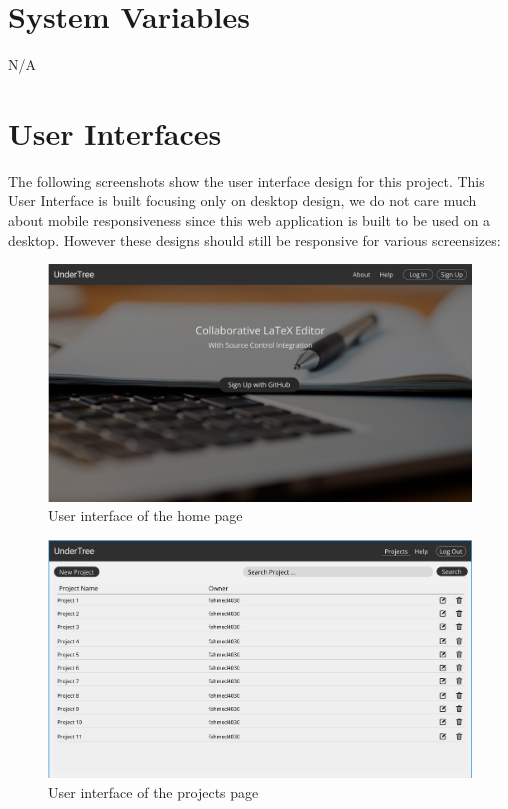 \documentclass[12pt, titlepage]{article}
\begin{document}
	\section{System Variables}
	
	N/A
	
	\section{User Interfaces}
	
	The following screenshots show the user interface design for this project. This User Interface is built focusing only on desktop design, we do not care much about mobile responsiveness since this web application is built to be used on a desktop. However these designs should still be responsive for various screensizes:
	
	\begin{figure}[H]
		\centering
		\includegraphics[width=\linewidth]{homePage.png}
		\caption{User interface of the home page}
	\end{figure}
	
	\begin{figure}[H]
		\centering
		\includegraphics[width=\linewidth]{projectsPage.png}
		\caption{User interface of the projects page}
	\end{figure}
	
\end{document}
